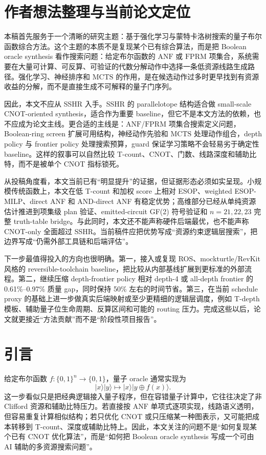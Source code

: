 \documentclass[UTF8,fontset=macnew,11pt]{ctexart}
\newcommand{\anf}{\ensuremath{\mathrm{ANF}}}
\newcommand{\fprm}{\ensuremath{\mathrm{FPRM}}}
\newcommand{\mcts}{\ensuremath{\mathrm{MCTS}}}
\newcommand{\xor}{\ensuremath{\oplus}}
\newcommand{\ttable}{truth-table}
\begin{document}
\section*{作者想法整理与当前论文定位}

本稿首先服务于一个清晰的研究主题：基于强化学习与蒙特卡洛树搜索的量子布尔函数综合方法。这个主题的本质不是复现某个已有综合算法，而是把 Boolean oracle synthesis 看作搜索问题：给定布尔函数的 \anf{} 或 \fprm{} 项集合，系统需要在大量可计算、可反算、可验证的代数分解动作中选择一条低资源线路生成路径。强化学习、神经排序和 \mcts{} 的作用，是在候选动作过多时更早找到有资源收益的分解，而不是直接生成不可解释的量子门序列。

因此，本文不应从 SSHR 入手。SSHR 的 parallelotope 结构适合做 small-scale CNOT-oriented synthesis，适合作为重要 baseline，但它不是本文方法的依赖，也不应成为论文主线。更合适的主线是：\anf{}/\fprm{} 项集合搜索定义问题，Boolean-ring screen 扩展可用结构，神经动作先验和 \mcts{} 处理动作组合，depth policy 与 frontier policy 处理搜索预算，guard 保证学习策略不会轻易劣于确定性 baseline。这样的叙事可以自然比较 T-count、CNOT、门数、线路深度和辅助比特，而不是被单个 CNOT 指标锁死。

从投稿角度看，本文当前已有“明显提升”的证据，但证据形态必须如实呈现。小规模传统函数上，本文在低 T-count 和加权 score 上相对 ESOP、weighted ESOP-MILP、direct ANF 和 AND-direct ANF 有稳定优势；高维部分已经从单纯资源估计推进到项集级 plan 验证、emitted-circuit GF(2) 符号验证和 $n=21,22,23$ 完整 \ttable{} bridge。与此同时，本文还不能声称硬件后端最优，也不能声称 CNOT-only 全面超过 SSHR。当前稿件应把优势写成“资源约束逻辑层搜索”，把边界写成“仍需外部工具链和后端评估”。

下一步最值得投入的方向也很明确。第一，接入或复现 ROS、mockturtle/RevKit 风格的 reversible-toolchain baseline，把比较从内部基线扩展到更标准的外部流程。第二，继续压缩 depth-frontier policy 相对 depth-4 或 all-depth frontier 的 0.61\%--0.97\% 质量 gap，同时保持 50\% 左右的时间节省。第三，在当前 schedule proxy 的基础上进一步做真实后端映射或至少更精细的逻辑层调度，例如 T-depth 模板、辅助量子位生命周期、反算区间和可能的 routing 压力。完成这些以后，论文就更接近“方法贡献”而不是“阶段性项目报告”。

\section{引言}

给定布尔函数 $f:\{0,1\}^n\rightarrow\{0,1\}$，量子 oracle 通常实现为
\begin{equation}
  |x\rangle |y\rangle \mapsto |x\rangle |y\xor f(x)\rangle .
  \label{eq:oracle}
\end{equation}
这一步看似只是把经典逻辑接入量子程序，但在容错量子计算中，它往往决定了非 Clifford 资源和辅助比特压力。若直接按 \anf{} 单项式逐项实现，线路语义透明，但容易重复计算相似结构；若只优化 CNOT 或只压缩某一种图表示，又可能把成本转移到 T-count、深度或辅助比特上。因此，本文关注的问题不是“如何复现某个已有 CNOT 优化算法”，而是“如何把 Boolean oracle synthesis 写成一个可由 AI 辅助的多资源搜索问题”。
\end{document}
